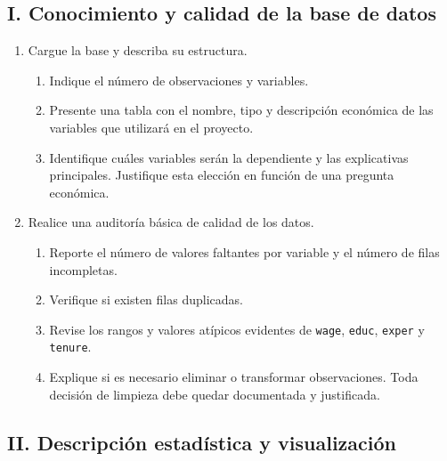 \documentclass[letterpaper,11pt]{article}
\begin{document}
\subsection*{I. Conocimiento y calidad de la base de datos}

\begin{enumerate}

\item Cargue la base y describa su estructura.
    \begin{enumerate}[label=(\alph*)]
        \item Indique el número de observaciones y variables.
        \item Presente una tabla con el nombre, tipo y descripción económica de
              las variables que utilizará en el proyecto.
        \item Identifique cuáles variables serán la dependiente y las
              explicativas principales. Justifique esta elección en función de
              una pregunta económica.
    \end{enumerate}

\item Realice una auditoría básica de calidad de los datos.
    \begin{enumerate}[label=(\alph*)]
        \item Reporte el número de valores faltantes por variable y el número
              de filas incompletas.
        \item Verifique si existen filas duplicadas.
        \item Revise los rangos y valores atípicos evidentes de \texttt{wage},
              \texttt{educ}, \texttt{exper} y \texttt{tenure}.
        \item Explique si es necesario eliminar o transformar observaciones.
              Toda decisión de limpieza debe quedar documentada y justificada.
    \end{enumerate}

\end{enumerate}

\subsection*{II. Descripción estadística y visualización}
\end{document}
